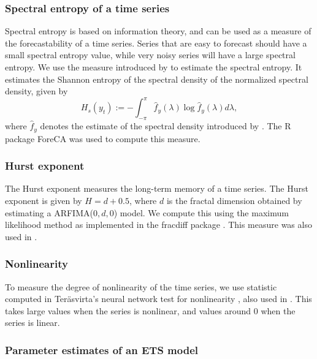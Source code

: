 \documentclass[11pt,a4paper,]{article}
\theoremstyle{definition}
\theoremstyle{definition}
\theoremstyle{definition}
\theoremstyle{remark}
\begin{document}
\subsubsection*{Spectral entropy of a time
series}\label{spectral-entropy-of-a-time-series}

Spectral entropy is based on information theory, and can be used as a
measure of the forecastability of a time series. Series that are easy to
forecast should have a small spectral entropy value, while very noisy
series will have a large spectral entropy. We use the measure introduced
by \textcite{goerg2013forecastable} to estimate the spectral entropy. It
estimates the Shannon entropy of the spectral density of the normalized
spectral density, given by \[ 
  H_{s}(y_t):=-\int_{-\pi}^{\pi}\hat f_y(\lambda)\log \hat f_y({\lambda})d\lambda,
\] where \(\hat{f}_y\) denotes the estimate of the spectral density
introduced by \textcite{nuttall1982spectral}. The R package ForeCA
\autocite{Foreca} was used to compute this measure.

\subsubsection*{Hurst exponent}\label{hurst-exponent}

The Hurst exponent measures the long-term memory of a time series. The
Hurst exponent is given by \(H=d+0.5\), where \(d\) is the fractal
dimension obtained by estimating a ARFIMA(\(0, d, 0\)) model. We compute
this using the maximum likelihood method \autocite{haslett1989space} as
implemented in the fracdiff package \autocite{fracdiff}. This measure
was also used in \textcite{wang2009rule}.

\subsubsection*{Nonlinearity}\label{nonlinearity}

To measure the degree of nonlinearity of the time series, we use
statistic computed in Teräsvirta's neural network test for nonlinearity
\autocite{nonlintest}, also used in \textcite{wang2009rule}. This takes
large values when the series is nonlinear, and values around 0 when the
series is linear.

\subsubsection*{Parameter estimates of an ETS
model}\label{parameter-estimates-of-an-ets-model}
\end{document}

